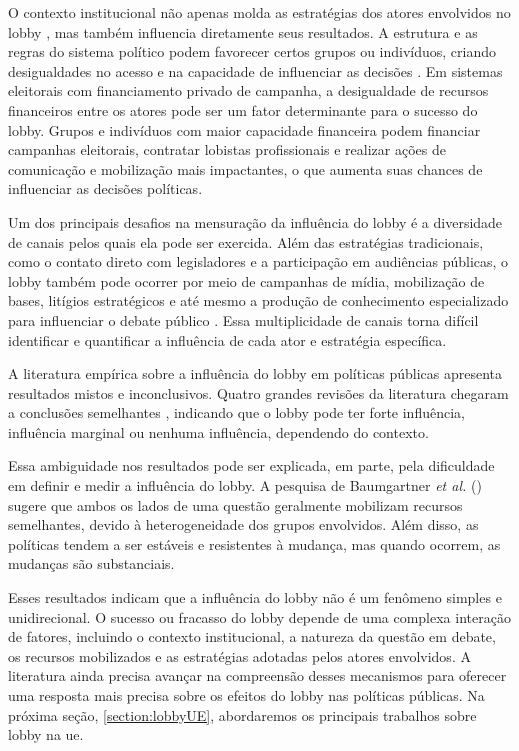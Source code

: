O contexto institucional não apenas molda as estratégias dos atores envolvidos no lobby \cite{Pop2013Lobbying}, mas também influencia diretamente seus resultados. A estrutura e as regras do sistema político podem favorecer certos grupos ou indivíduos, criando desigualdades no acesso e na capacidade de influenciar as decisões \cite{mahoney_lobbying_2007}.
    Em sistemas eleitorais com financiamento privado de campanha, a desigualdade de recursos financeiros entre os atores pode ser um fator determinante para o sucesso do lobby. Grupos e indivíduos com maior capacidade financeira podem financiar campanhas eleitorais, contratar lobistas profissionais e realizar ações de comunicação e mobilização mais impactantes, o que aumenta suas chances de influenciar as decisões políticas\cite{mahoney_lobbying_2007}.

    Um dos principais desafios na mensuração da influência do lobby é a diversidade de canais pelos quais ela pode ser exercida. Além das estratégias tradicionais, como o contato direto com legisladores e a participação em audiências públicas, o lobby também pode ocorrer por meio de campanhas de mídia, mobilização de bases, litígios estratégicos e até mesmo a produção de conhecimento especializado para influenciar o debate público \cite{dur_measuring_2008}. Essa multiplicidade de canais torna difícil identificar e quantificar a influência de cada ator e estratégia específica.

A literatura empírica sobre a influência do lobby em políticas públicas apresenta resultados mistos e inconclusivos. Quatro grandes revisões da literatura chegaram a conclusões semelhantes \cite{smith1995interest, baumgartner1998basic,burnstein2002, de_figueiredo_advancing_2014}, indicando que o lobby pode ter forte influência, influência marginal ou nenhuma influência, dependendo do contexto.

Essa ambiguidade nos resultados pode ser explicada, em parte, pela dificuldade em definir e medir a influência do lobby. A pesquisa de Baumgartner \textit{et al.} (\citeyear{baumgartner2009lobbying}) sugere que ambos os lados de uma questão geralmente mobilizam recursos semelhantes, devido à heterogeneidade dos grupos envolvidos. Além disso, as políticas tendem a ser estáveis e resistentes à mudança, mas quando ocorrem, as mudanças são substanciais.

Esses resultados indicam que a influência do lobby não é um fenômeno simples e unidirecional. O sucesso ou fracasso do lobby depende de uma complexa interação de fatores, incluindo o contexto institucional, a natureza da questão em debate, os recursos mobilizados e as estratégias adotadas pelos atores envolvidos. A literatura ainda precisa avançar na compreensão desses mecanismos para oferecer uma resposta mais precisa sobre os efeitos do lobby nas políticas públicas. Na próxima seção, \ref{section:lobbyUE}, abordaremos os principais trabalhos sobre lobby na \acrshort{ue}.
